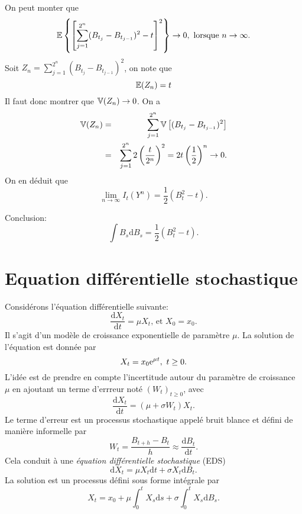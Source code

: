 \begin{ex}
\begin{enumerate}
$$$$
On peut monter que 
$$
\mathbb{E}\left\{\left[\sum_{j =1}^{2^n}(B_{t_j}- B_{t_{j-1}})^2 - t\right]^2\right\}\rightarrow 0,\text{ lorsque }n\rightarrow \infty.
$$
Soit $Z_n= \sum_{j =1}^{2^n}(B_{t_j}- B_{t_{j-1}})^2$, on note que 
$$
\mathbb{E}(Z_n) = t
$$
Il faut donc montrer que $\mathbb{V}(Z_n) \rightarrow 0$. On a 
\begin{eqnarray*}
\mathbb{V}(Z_n) &=& \sum_{j = 1}^{2^n} \mathbb{V}\left[(B_{t_j}-B_{t_{j-1}})^2\right]\\
&=&\sum_{j = 1}^{2^n}2\left(\frac{t}{2^n}\right)^2 = 2t\left(\frac{1}{2}\right)^n\rightarrow 0.
\end{eqnarray*}
On en déduit que 
$$
\underset{n\rightarrow \infty}{\lim} I_t(Y^n) = \frac{1}{2}(B_t^2 - t).
$$

\end{enumerate}
Conclusion:
$$
\int B_s\text{d}B_s = \frac{1}{2}(B_t^2 - t).
$$

\end{ex}
\section{Equation différentielle stochastique}\label{sec:eds}
Considérons l'équation différentielle suivante:
$$
\frac{\text{d}X_t}{\text{d}t} = \mu X_t\text{, et }X_0 = x_0.
$$
Il s'agit d'un modèle de croissance exponentielle de paramètre $\mu$. La solution de l'équation est donnée par 
$$
X_t = x_0\mathrm{e}^{\mu t},\text{ }t\geq 0.
$$
L'idée est de prendre en compte l'incertitude autour du paramètre de croissance $\mu$ en ajoutant un terme d'errreur noté $(W_t)_{t\geq 0}$, avec 
$$
\frac{\text{d}X_t}{\text{d}t} = (\mu+\sigma W_t) X_t.
$$
Le terme d'erreur est un processus stochastique appelé bruit blance et défini de manière informelle par 
$$
W_t = \frac{B_{t+h}-B_t}{h}\approx\frac{\text{d}B_t}{\text{d}t}.
$$
Cela conduit à une \textit{équation différentielle stochastique} (EDS)
$$
\text{d}X_t = \mu X_t\text{d}t+\sigma X_t\text{d}B_t.
$$
La solution est un processus défini sous forme intégrale par 
$$
X_t = x_0 + \mu \int_0^t X_s\text{d}s+\sigma \int_0^t X_s\text{d}B_s.
$$
